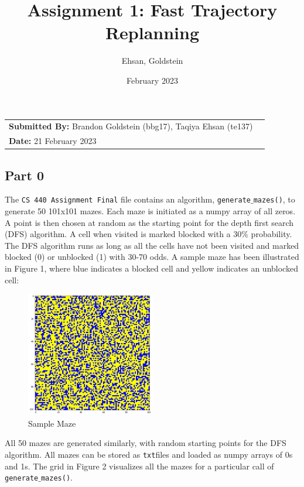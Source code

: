 \documentclass{article}
\title{\textbf{Assignment 1:} Fast Trajectory Replanning}
\author{Ehsan, Goldstein}
\date{February 2023}
\begin{document}
\maketitle

\noindent\begin{tabular}{@{}ll}
    \textbf{Submitted By: }Brandon Goldstein (bbg17), Taqiya Ehsan (te137)\\
     \textbf{Date: } 21 February 2023
\end{tabular}

\subsection*{Part 0}
The \texttt{CS 440 Assignment Final} file contains an algorithm, \texttt{generate\(\_\)mazes()}, to generate 50 101x101 mazes. Each maze is initiated as a numpy array of all zeros. A  point is then chosen at random as the starting point for the depth first search (DFS) algorithm. A cell when visited is marked blocked with a 30\(\%\) probability. The DFS algorithm runs as long as all the cells have not been visited and marked blocked (0) or unblocked (1) with 30-70 odds. A sample maze has been illustrated in Figure 1, where blue indicates a blocked cell and yellow indicates an unblocked cell:

\begin{figure}[!htbp]
\centering
\includegraphics[width=0.5\textwidth, height=0.5\textheight,keepaspectratio]{maze_big.png}
\caption{Sample Maze}
    \label{fig:Map}
\end{figure}

\noindent
All 50 mazes are generated similarly, with random starting points for the DFS algorithm. All mazes can be stored as \texttt{txt}files and loaded as numpy arrays of 0s and 1s. The grid in Figure 2 visualizes all the mazes for a particular call of \texttt{generate\(\_\)mazes()}.\\
\end{document}
